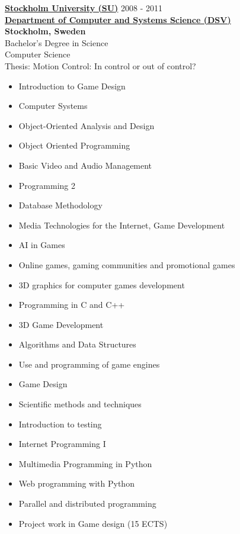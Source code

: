 \documentclass[margin]{res}
\begin{document}
\begin{resume}
			{\bf \href{http://www.su.se/}{Stockholm University (SU)}} \hfill 2008
			- 2011 \\ 
			{\bf \href{http://dsv.su.se/}{Department of Computer and Systems
			Science (DSV)} \\ Stockholm, Sweden} \\
			Bachelor's Degree in Science  \\
			Computer Science \\
			Thesis: Motion Control: In control or out of control? \\
		    \begin{itemize}  \itemsep -2pt %
          		\item Introduction to Game Design
          		\item Computer Systems
          		\item Object-Oriented Analysis and Design
          		\item Object Oriented Programming \\
          		\item Basic Video and Audio Management
          		\item Programming 2
          		\item Database Methodology
          		\item Media Technologies for the Internet, Game Development \\
          		\item AI in Games
          		\item Online games, gaming communities and promotional games
          		\item 3D graphics for computer games development
          		\item Programming in C and C++ \\
          		\item 3D Game Development
          		\item Algorithms and Data Structures
          		\item Use and programming of game engines
          		\item Game Design \\
          		\item Scientific methods and techniques
          		\item Introduction to testing
          		\item Internet Programming I
          		\item Multimedia Programming in Python \\
          		\item Web programming with Python
          		\item Parallel and distributed programming
          		\item Project work in Game design (15 ECTS)
    		\end{itemize}
		    

\end{resume}
\end{document}
